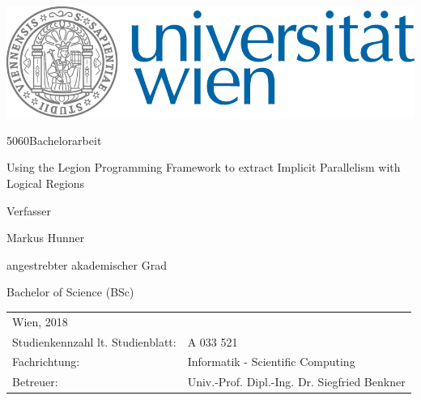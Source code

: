 \documentclass{article}      %
\makeatletter
\newcommand\HUGE{\@setfontsize\Huge{50}{60}}
\makeatother
\begin{document}


\thispagestyle{empty}
\begin{center}
	\begin{minipage}{0.9\linewidth}
		\flushright%

		\includegraphics[width=0.5\linewidth]{univie.jpg}\par
		\vspace{1.5cm}
		\centering
		{\scshape{\HUGE Bachelorarbeit\par}}
		\vspace{1cm}
		{\scshape{Using the Legion Programming Framework to extract Implicit Parallelism with Logical Regions\par}}
		\vspace{2cm}


		Verfasser  \linebreak
		{\Large Markus Hunner \par}
		\vspace{1.5cm}
		angestrebter akademischer Grad\linebreak
		{\Large Bachelor of Science (BSc)\par}
		\vspace{1.5cm}

		\flushleft%


		\begin{tabular}{ll}
			Wien, 2018 \linebreak
			\vspace{1cm}                      & \\
			Studienkennzahl lt. Studienblatt: & A 033 521 \vspace{0.3cm}\\
			Fachrichtung:                     & Informatik  -  Scientific Computing \vspace{0.3cm}\\
			Betreuer:            & Univ.-Prof. Dipl.-Ing. Dr. Siegfried Benkner \\
		\end{tabular}




	\end{minipage}
\end{center}
\clearpage
\end{document}
